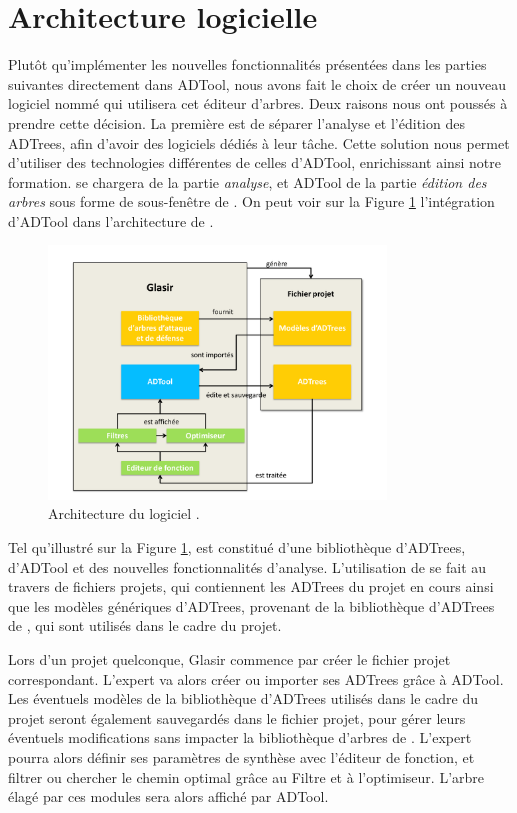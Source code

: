 \section{Architecture logicielle}

	Plutôt qu'implémenter les nouvelles fonctionnalités présentées dans les parties suivantes directement dans ADTool, nous avons fait le choix de créer un nouveau logiciel nommé \glasir{} qui utilisera cet éditeur d'arbres. Deux raisons nous ont poussés à prendre cette décision. 
La première est de séparer l'analyse et l'édition des ADTrees, afin d'avoir des logiciels dédiés à leur tâche. Cette solution nous permet d'utiliser des technologies différentes de celles d'ADTool, enrichissant ainsi notre formation. \glasir{} se chargera de la partie \textit{analyse}, et ADTool de la partie \textit{édition des arbres} sous forme de sous-fenêtre de \glasir{}. On peut voir sur la {\sc Figure} \ref{fig:architecture_Glasir} l'intégration d'ADTool dans l'architecture de \glasir. 

	\begin{figure}[h!]
		\centering
			\includegraphics[width=0.8\textwidth]{figure/archiGlasir.pdf}
		\caption{Architecture du logiciel \glasir.}
		\label{fig:architecture_Glasir}
	\end{figure}

	Tel qu'illustré sur la {\sc Figure} \ref{fig:architecture_Glasir}, \glasir{} est constitué d'une bibliothèque d'ADTrees, d'ADTool et des nouvelles fonctionnalités d'analyse. L'utilisation de \glasir{} se fait au travers de fichiers projets, qui contiennent les ADTrees du projet en cours ainsi que les modèles génériques d'ADTrees, provenant de la bibliothèque d'ADTrees de \glasir{}, qui sont utilisés dans le cadre du projet.
	
	Lors d'un projet quelconque, Glasir commence par créer le fichier projet correspondant. L'expert va alors créer ou importer ses ADTrees grâce à ADTool. Les éventuels modèles de la bibliothèque d'ADTrees utilisés dans le cadre du projet seront également sauvegardés dans le fichier projet, pour gérer leurs éventuels modifications sans impacter la bibliothèque d'arbres de \glasir{}. L'expert pourra alors définir ses paramètres de synthèse avec l'éditeur de fonction, et filtrer ou chercher le chemin optimal grâce au Filtre et à l'optimiseur. L'arbre élagé par ces modules sera alors affiché par ADTool.